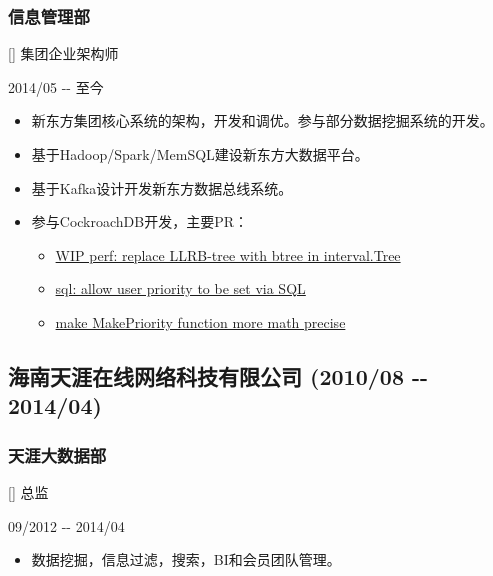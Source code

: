 \documentclass[a4paper]{article}
\newenvironment{DUlineblock}[1]{%
    \list{}{\setlength{\partopsep}{\parskip}
            \addtolength{\partopsep}{\baselineskip}
            \setlength{\topsep}{0pt}
            \setlength{\itemsep}{0.15\baselineskip}
            \setlength{\parsep}{0pt}
            \setlength{\leftmargin}{#1}}
    \raggedright
  }
  {\endlist}
\begin{document}
\begin{CJK}{UTF8}{gkai}
\subsubsection*{信息管理部}
\begin{DUlineblock}{0em}
\item[] 集团企业架构师
\item[] 2014/05 -{}- 至今
\end{DUlineblock}
\begin{itemize}
\item 新东方集团核心系统的架构，开发和调优。参与部分数据挖掘系统的开发。
\item 基于Hadoop/Spark/MemSQL建设新东方大数据平台。
\item 基于Kafka设计开发新东方数据总线系统。
\item 参与CockroachDB开发，主要PR：
\begin{itemize}
  \item \href{https://github.com/cockroachdb/cockroach/pull/8867}{WIP perf: replace LLRB-tree with btree in interval.Tree}
  \item \href{https://github.com/cockroachdb/cockroach/pull/3912}{sql: allow user priority to be set via SQL}
  \item \href{https://github.com/cockroachdb/cockroach/pull/3783}{make MakePriority function more math precise}
\end{itemize}
\end{itemize}

\subsection*{海南天涯在线网络科技有限公司 (2010/08 -{}- 2014/04)}

\subsubsection*{天涯大数据部}
\begin{DUlineblock}{0em}
\item[] 总监
\item[] 09/2012 -{}- 2014/04
\end{DUlineblock}
\begin{itemize}
\item 数据挖掘，信息过滤，搜索，BI和会员团队管理。
\end{itemize}


\end{CJK}
\end{document}
